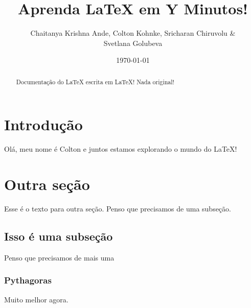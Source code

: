 \documentclass[12pt]{article}
\author{Chaitanya Krishna Ande, Colton Kohnke, Sricharan Chiruvolu \& \\
Svetlana Golubeva}
\date{\today}
\title{Aprenda \LaTeX{} em Y Minutos!}
\begin{document}
\maketitle

\newpage
\tableofcontents

\newpage

\begin{abstract}
 Documentação do \LaTeX{} escrita em \LaTeX! Nada original!
\end{abstract}

\section{Introdução}
Olá, meu nome é Colton e juntos estamos explorando o mundo do \LaTeX!

\section{Outra seção}
Esse é o texto para outra seção. Penso que precisamos de uma subseção.

\subsection{Isso é uma subseção} %
Penso que precisamos de mais uma

\subsubsection{Pythagoras}
Muito melhor agora.
\label{subsec:pythagoras}

\end{document}

